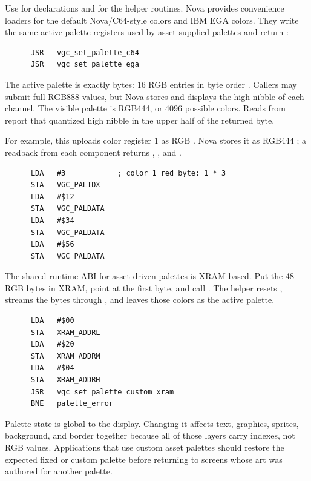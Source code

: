 Use  for declarations and
 for the helper routines. Nova provides convenience
loaders for the default Nova/C64-style colors and IBM EGA colors. They write
the same active palette registers used by asset-supplied palettes and return
:

\begin{lstlisting}
      JSR   vgc_set_palette_c64
      JSR   vgc_set_palette_ega
\end{lstlisting}

The active palette is exactly  bytes: 16
RGB entries in byte order . Callers
may submit full RGB888 values, but Nova stores and displays the high nibble of
each channel. The visible palette is RGB444, or 4096 possible colors. Reads
from  report that quantized high nibble in the upper
half of the returned byte.

For example, this uploads color register 1 as RGB .
Nova stores it as RGB444 ; a readback from each component
returns , , and .

\begin{lstlisting}
      LDA   #3            ; color 1 red byte: 1 * 3
      STA   VGC_PALIDX
      LDA   #$12
      STA   VGC_PALDATA
      LDA   #$34
      STA   VGC_PALDATA
      LDA   #$56
      STA   VGC_PALDATA
\end{lstlisting}

The shared runtime ABI for asset-driven palettes is XRAM-based. Put the 48 RGB
bytes in XRAM, point  at the first byte, and call
. The helper resets
, streams the bytes through , and
leaves those colors as the active palette.

\begin{lstlisting}
      LDA   #$00
      STA   XRAM_ADDRL
      LDA   #$20
      STA   XRAM_ADDRM
      LDA   #$04
      STA   XRAM_ADDRH
      JSR   vgc_set_palette_custom_xram
      BNE   palette_error
\end{lstlisting}

Palette state is global to the display. Changing it affects text, graphics,
sprites, background, and border together because all of those layers carry
indexes, not RGB values. Applications that use custom asset palettes should
restore the expected fixed or custom palette before returning to screens whose
art was authored for another palette.

